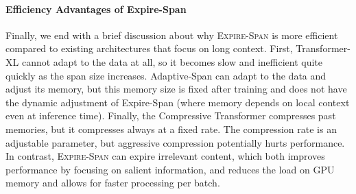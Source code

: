 \paragraph{Efficiency Advantages of Expire-Span} 

Finally, we end with a brief discussion about why \textsc{Expire-Span} is more efficient compared to existing architectures that focus on long context. First, Transformer-XL cannot adapt to the data at all, so it becomes slow and inefficient quite quickly as the span size increases. Adaptive-Span can adapt to the data and adjust its memory, but this memory size is fixed after training and does not have the dynamic adjustment of Expire-Span (where memory depends on local context even at inference time). Finally, the Compressive Transformer compresses past memories, but it compresses always at a fixed rate. The compression rate is an adjustable parameter, but aggressive compression potentially hurts performance. In contrast, \textsc{Expire-Span} can expire irrelevant content, which both improves performance by focusing on salient information, and reduces the load on GPU memory and allows for faster processing per batch. 


